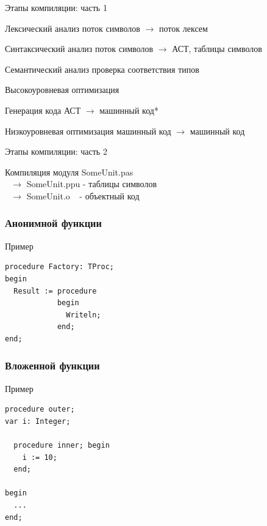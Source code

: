 \documentclass[roman,12pt]{beamer}
\begin{document}
\begin{frame}{Этапы компиляции: часть 1}
 \begin{block}{Лексический анализ}
   поток символов $\rightarrow$ поток лексем
 \end{block}
 \begin{block}{Синтаксический анализ}
   поток символов $\rightarrow$ АСТ, таблицы символов
 \end{block}
 \begin{block}{Семантический анализ}
   проверка соответствия типов
 \end{block}
 \begin{block}{Высокоуровневая оптимизация}
 \end{block}
 \begin{block}{Генерация кода}
   АСТ $\rightarrow$ машинный код*
 \end{block}
 \begin{block}{Низкоуровневая оптимизация}
   машинный код $\rightarrow$ машинный код
 \end{block}
\end{frame}

\begin{frame}{Этапы компиляции: часть 2}
 \begin{block}{Компиляция модуля}
   SomeUnit.pas \\
   $\ \ \ \rightarrow$ SomeUnit.ppu - таблицы символов\\
   $\ \ \ \rightarrow$ SomeUnit.o $\ \ $  - объектный код
 \end{block}
\end{frame}

\begin{frame}[fragile]
  \frametitle{Анонимной функции}
  \begin{block}{Пример}
    \begin{lstlisting}
procedure Factory: TProc;
begin
  Result := procedure
            begin
              Writeln;
            end;
end;
    \end{lstlisting}
  \end{block} 
\end{frame}

\begin{frame}[fragile]
  \frametitle{Вложенной функции}
  
  \begin{block}{Пример}
    \begin{lstlisting}    
procedure outer;
var i: Integer;

  procedure inner; begin
    i := 10;
  end;

begin
  ...
end;    
    \end{lstlisting}
  \end{block} 

\end{frame}
\end{document}
